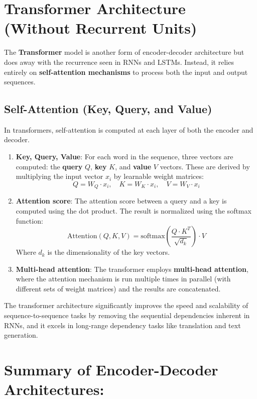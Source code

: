 \documentclass[10pt]{article}
\begin{document}
\section{ Transformer Architecture (Without Recurrent Units)}

The {\bf Transformer} model is another form of encoder-decoder architecture but does away with the recurrence seen in RNNs and LSTMs. Instead, it relies entirely on {\bf self-attention mechanisms} to process both the input and output sequences.

\subsection{ Self-Attention (Key, Query, and Value)}
In transformers, self-attention is computed at each layer of both the encoder and decoder.

\begin{enumerate}
   \item {\bf Key, Query, Value}: For each word in the sequence, three vectors are computed: the {\bf query} \( Q \), {\bf key} \( K \), and {\bf value} \( V \) vectors. These are derived by multiplying the input vector \( x_i \) by learnable weight matrices:
      \[
      Q = W_Q \cdot x_i, \quad K = W_K \cdot x_i, \quad V = W_V \cdot x_i
      \]
   
   \item {\bf Attention score}: The attention score between a query and a key is computed using the dot product. The result is normalized using the softmax function:
      \[
      \text{Attention}(Q, K, V) = \text{softmax}\left(\frac{Q \cdot K^T}{\sqrt{d_k}}\right) \cdot V
      \]
      Where \( d_k \) is the dimensionality of the key vectors.
   
   \item {\bf Multi-head attention}: The transformer employs {\bf multi-head attention}, where the attention mechanism is run multiple times in parallel (with different sets of weight matrices) and the results are concatenated.
\end{enumerate}

The transformer architecture significantly improves the speed and scalability of sequence-to-sequence tasks by removing the sequential dependencies inherent in RNNs, and it excels in long-range dependency tasks like translation and text generation.

\section{ Summary of Encoder-Decoder Architectures:}
\end{document}
